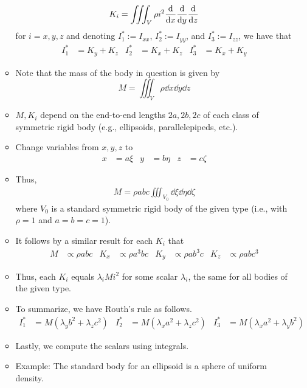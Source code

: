 \documentclass[../notes.tex]{subfiles}
\begin{document}
\begin{itemize}
\begin{itemize}
\begin{equation*}
            K_i = \iiint_V\rho i^2\dv{x}\dv{y}\dv{z}
        \end{equation*}
        for $i=x,y,z$ and denoting $I_1^*:=I_{xx}$, $I_2^*:=I_{yy}$, and $I_3^*:=I_{zz}$, we have that
        \begin{align*}
            I_1^* &= K_y+K_z&
            I_2^* &= K_x+K_z&
            I_3^* &= K_x+K_y
        \end{align*}
        \item Note that the mass of the body in question is given by
        \begin{equation*}
            M = \iiint_V\rho\dd{x}\dd{y}\dd{z}
        \end{equation*}
        \item $M,K_i$ depend on the end-to-end lengths $2a,2b,2c$ of each class of symmetric rigid body (e.g., ellipsoids, parallelepipeds, etc.).
        \item Change variables from $x,y,z$ to
        \begin{align*}
            x &= a\xi&
            y &= b\eta&
            z &= c\zeta
        \end{align*}
        \item Thus,
        \begin{align*}
            M = \rho abc\iiint_{V_0}\dd{\xi}\dd{\eta}\dd{\zeta}
        \end{align*}
        where $V_0$ is a standard symmetric rigid body of the given type (i.e., with $\rho=1$ and $a=b=c=1$).
        \item It follows by a similar result for each $K_i$ that
        \begin{align*}
            M &\propto \rho abc&
            K_x &\propto \rho a^3bc&
            K_y &\propto \rho ab^3c&
            K_z &\propto \rho abc^3
        \end{align*}
        \item Thus, each $K_i$ equals $\lambda_iMi^2$ for some scalar $\lambda_i$, the same for all bodies of the given type.
        \item To summarize, we have Routh's rule as follows.
        \begin{align*}
            I_1^* &= M(\lambda_yb^2+\lambda_zc^2)&
            I_2^* &= M(\lambda_xa^2+\lambda_zc^2)&
            I_3^* &= M(\lambda_xa^2+\lambda_yb^2)
        \end{align*}
        \item Lastly, we compute the scalars using integrals.
        \item Example: The standard body for an ellipsoid is a sphere of uniform density.

\end{itemize}
\end{itemize}
\end{document}
